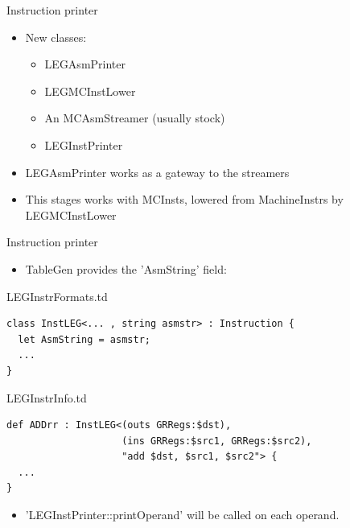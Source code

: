 \begin{frame}{Instruction printer}

\begin{itemize}
    \item New classes:
    \begin{itemize}
        \item LEGAsmPrinter
        \item LEGMCInstLower
        \item An MCAsmStreamer (usually stock)
        \item LEGInstPrinter
    \end{itemize}
    \item LEGAsmPrinter works as a gateway to the streamers
    \item This stages works with MCInsts, lowered from MachineInstrs by LEGMCInstLower
\end{itemize}

\end{frame}


\begin{frame}[fragile]{Instruction printer}

\begin{itemize}
    \item TableGen provides the 'AsmString' field:
\end{itemize}

\begin{block}{LEGInstrFormats.td}
\begin{lstlisting}
class InstLEG<... , string asmstr> : Instruction {
  let AsmString = asmstr;
  ...
}
\end{lstlisting}
\end{block}

\begin{block}{LEGInstrInfo.td}
\begin{lstlisting}
def ADDrr : InstLEG<(outs GRRegs:$dst),
                    (ins GRRegs:$src1, GRRegs:$src2),
                    "add $dst, $src1, $src2"> {
  ...
}
\end{lstlisting}
\end{block}

\begin{itemize}
    \item 'LEGInstPrinter::printOperand' will be called on each operand.
\end{itemize}

\end{frame}

